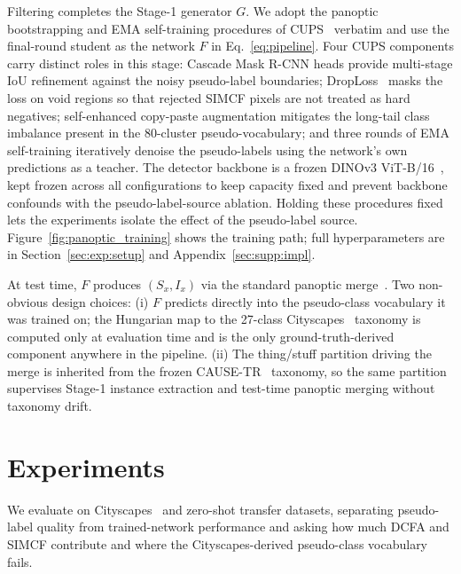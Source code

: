 \documentclass{article}
\begin{document}
Filtering completes the Stage-1 generator $G$. We adopt the panoptic bootstrapping and EMA self-training procedures of CUPS~\cite{hahn2025cups} verbatim and use the final-round student as the network $F$ in Eq.~\ref{eq:pipeline}. Four CUPS components carry distinct roles in this stage: Cascade Mask R-CNN heads provide multi-stage IoU refinement against the noisy pseudo-label boundaries; DropLoss~\cite{wang2023cutler} masks the loss on void regions so that rejected SIMCF pixels are not treated as hard negatives; self-enhanced copy-paste augmentation mitigates the long-tail class imbalance present in the 80-cluster pseudo-vocabulary; and three rounds of EMA self-training iteratively denoise the pseudo-labels using the network's own predictions as a teacher. The detector backbone is a frozen DINOv3 ViT-B/16~\cite{simeoni2025dinov3}, kept frozen across all configurations to keep capacity fixed and prevent backbone confounds with the pseudo-label-source ablation. Holding these procedures fixed lets the experiments isolate the effect of the pseudo-label source. Figure~\ref{fig:panoptic_training} shows the training path; full hyperparameters are in Section~\ref{sec:exp:setup} and Appendix~\ref{sec:supp:impl}.

At test time, $F$ produces $(S_x, I_x)$ via the standard panoptic merge~\cite{kirillov2019panoptic}. Two non-obvious design choices: (i) $F$ predicts directly into the pseudo-class vocabulary it was trained on; the Hungarian map to the 27-class Cityscapes~\cite{cordts2016cityscapes} taxonomy is computed only at evaluation time and is the only ground-truth-derived component anywhere in the pipeline. (ii) The thing/stuff partition driving the merge is inherited from the frozen CAUSE-TR~\cite{kim2024cause} taxonomy, so the same partition supervises Stage-1 instance extraction and test-time panoptic merging without taxonomy drift.

\FloatBarrier
\section{Experiments}
\label{sec:experiments}

We evaluate on Cityscapes~\cite{cordts2016cityscapes} and zero-shot transfer datasets, separating pseudo-label quality from trained-network performance and asking how much DCFA and SIMCF contribute and where the Cityscapes-derived pseudo-class vocabulary fails.
\end{document}
